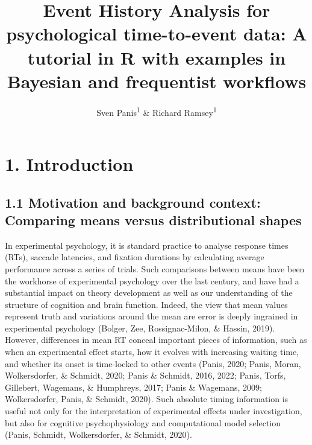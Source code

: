 \documentclass[
  man, donotrepeattitle,floatsintext]{apa6}
\title{Event History Analysis for psychological time-to-event data: A tutorial in R with examples in Bayesian and frequentist workflows}
\author{Sven Panis\textsuperscript{1} \& Richard Ramsey\textsuperscript{1}}
\date{}
\affiliation{\vspace{0.5cm}\textsuperscript{1} ETH Zürich}
\begin{document}
\maketitle

\section{1. Introduction}\label{introduction}

\subsection{1.1 Motivation and background context: Comparing means versus distributional shapes}\label{motivation-and-background-context-comparing-means-versus-distributional-shapes}

In experimental psychology, it is standard practice to analyse response times (RTs), saccade latencies, and fixation durations by calculating average performance across a series of trials. Such comparisons between means have been the workhorse of experimental psychology over the last century, and have had a substantial impact on theory development as well as our understanding of the structure of cognition and brain function. Indeed, the view that mean values represent truth and variations around the mean are error is deeply ingrained in experimental psychology (Bolger, Zee, Rossignac-Milon, \& Hassin, 2019). However, differences in mean RT conceal important pieces of information, such as when an experimental effect starts, how it evolves with increasing waiting time, and whether its onset is time-locked to other events (Panis, 2020; Panis, Moran, Wolkersdorfer, \& Schmidt, 2020; Panis \& Schmidt, 2016, 2022; Panis, Torfs, Gillebert, Wagemans, \& Humphreys, 2017; Panis \& Wagemans, 2009; Wolkersdorfer, Panis, \& Schmidt, 2020). Such absolute timing information is useful not only for the interpretation of experimental effects under investigation, but also for cognitive psychophysiology and computational model selection (Panis, Schmidt, Wolkersdorfer, \& Schmidt, 2020).
\end{document}
